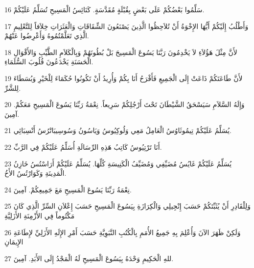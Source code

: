 \par 16 سَلِّمُوا بَعْضُكُمْ عَلَى بَعْضٍ بِقُبْلَةٍ مُقَدَّسَةٍ. كَنَائِسُ الْمَسِيحِ تُسَلِّمُ عَلَيْكُمْ.
\par 17 وَأَطْلُبُ إِلَيْكُمْ أَيُّهَا الإِخْوَةُ أَنْ تُلاَحِظُوا الَّذِينَ يَصْنَعُونَ الشِّقَاقَاتِ وَالْعَثَرَاتِ خِلاَفاً لِلتَّعْلِيمِ الَّذِي تَعَلَّمْتُمُوهُ وَأَعْرِضُوا عَنْهُمْ.
\par 18 لأَنَّ مِثْلَ هَؤُلاَءِ لاَ يَخْدِمُونَ رَبَّنَا يَسُوعَ الْمَسِيحَ بَلْ بُطُونَهُمْ وَبِالْكَلاَمِ الطَّيِّبِ وَالأَقْوَالِ الْحَسَنَةِ يَخْدَعُونَ قُلُوبَ السُّلَمَاءِ.
\par 19 لأَنَّ طَاعَتَكُمْ ذَاعَتْ إِلَى الْجَمِيعِ فَأَفْرَحُ أَنَا بِكُمْ وَأُرِيدُ أَنْ تَكُونُوا حُكَمَاءَ لِلْخَيْرِ وَبُسَطَاءَ لِلشَّرِّ.
\par 20 وَإِلَهُ السَّلاَمِ سَيَسْحَقُ الشَّيْطَانَ تَحْتَ أَرْجُلِكُمْ سَرِيعاً. نِعْمَةُ رَبِّنَا يَسُوعَ الْمَسِيحِ مَعَكُمْ. آمِينَ.
\par 21 يُسَلِّمُ عَلَيْكُمْ تِيمُوثَاوُسُ الْعَامِلُ مَعِي وَلُوكِيُوسُ وَيَاسُونُ وَسُوسِيبَاتْرُسُ أَنْسِبَائِي.
\par 22 أَنَا تَرْتِيُوسُ كَاتِبُ هَذِهِ الرِّسَالَةِ أُسَلِّمُ عَلَيْكُمْ فِي الرَّبِّ.
\par 23 يُسَلِّمُ عَلَيْكُمْ غَايُسُ مُضَيِّفِي وَمُضَيِّفُ الْكَنِيسَةِ كُلِّهَا. يُسَلِّمُ عَلَيْكُمْ أَرَاسْتُسُ خَازِنُ الْمَدِينَةِ وَكَوَارْتُسُ الأَخُ.
\par 24 نِعْمَةُ رَبِّنَا يَسُوعَ الْمَسِيحِ مَعَ جَمِيعِكُمْ. آمِينَ.
\par 25 وَلِلْقَادِرِ أَنْ يُثَبِّتَكُمْ حَسَبَ إِنْجِيلِي وَالْكِرَازَةِ بِيَسُوعَ الْمَسِيحِ حَسَبَ إِعْلاَنِ السِّرِّ الَّذِي كَانَ مَكْتُوماً فِي الأَزْمِنَةِ الأَزَلِيَّةِ
\par 26 وَلَكِنْ ظَهَرَ الآنَ وَأُعْلِمَ بِهِ جَمِيعُ الأُمَمِ بِالْكُتُبِ النَّبَوِيَّةِ حَسَبَ أَمْرِ الإِلَهِ الأَزَلِيِّ لإِطَاعَةِ الإِيمَانِ
\par 27 ِللهِ الْحَكِيمِ وَحْدَهُ بِيَسُوعَ الْمَسِيحِ لَهُ الْمَجْدُ إِلَى الأَبَدِ. آمِينَ.

